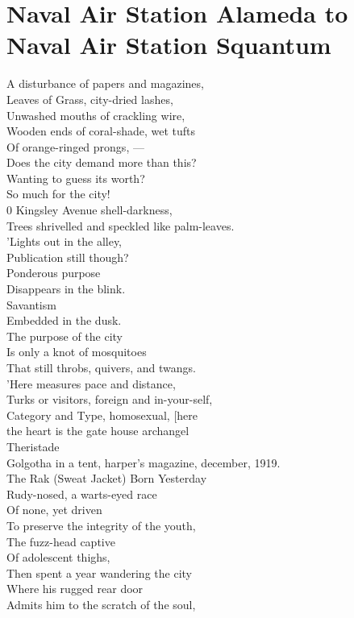 \documentclass[smalldemyvopaper,11pt,twoside,onecolumn,openright,extrafontsizes]{memoir}
\begin{document}
\chapter{Naval Air Station Alameda to Naval Air Station Squantum}
A disturbance of papers and magazines,
\\Leaves of Grass, city-dried lashes,
\\Unwashed mouths of crackling wire,
\\Wooden ends of coral-shade, wet tufts
\\Of orange-ringed prongs, —
\\Does the city demand more than this?
\\Wanting to guess its worth?
\\So much for the city!
\\0 Kingsley Avenue shell-darkness,
\\Trees shrivelled and speckled like palm-leaves.
\\'Lights out in the alley,
\\Publication still though?
\\Ponderous purpose
\\Disappears in the blink.
\\Savantism
\\Embedded in the dusk.
\\The purpose of the city
\\Is only a knot of mosquitoes
\\That still throbs, quivers, and twangs.
\\'Here measures pace and distance,
\\Turks or visitors, foreign and in-your-self,
\\Category and Type, homosexual, [here
\\the heart is the gate house archangel
\\Theristade
\\Golgotha in a tent, harper's magazine, december, 1919.
\\The Rak (Sweat Jacket) Born Yesterday
\\Rudy-nosed, a warts-eyed race
\\Of none, yet driven
\\To preserve the integrity of the youth,
\\The fuzz-head captive
\\Of adolescent thighs,
\\Then spent a year wandering the city
\\Where his rugged rear door
\\Admits him to the scratch of the soul,
\end{document}
